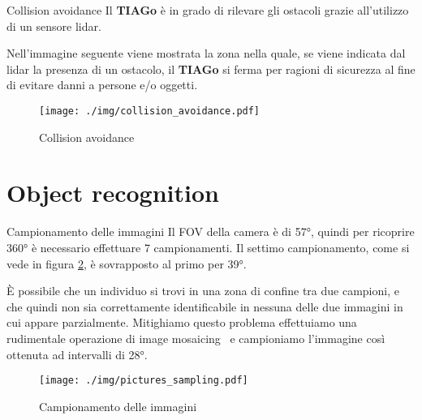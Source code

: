 \documentclass[10pt]{beamer}
\begin{document}
	\begin{frame}{Collision avoidance}
		Il \textbf{TIAGo} è in grado di rilevare gli ostacoli grazie
		all'utilizzo di un sensore lidar.  
		
		Nell'immagine seguente viene mostrata la zona nella quale, se viene
		indicata dal lidar la presenza di un ostacolo, il \textbf{TIAGo} si
		ferma per ragioni di sicurezza al fine di evitare danni a persone e/o
		oggetti.
		\begin{figure}[H]
			\centering
			\texttt{[image: ./img/collision\_avoidance.pdf]}
			\caption{Collision avoidance}
			\label{fig:collision_avoidance}
		\end{figure}
	\end{frame}
	
	\section{Object recognition}\label{sec:Object-recognition}
	\frame{\sectionpage}
	
	\begin{frame}{Campionamento delle immagini}
		Il FOV della camera è di 57°, quindi per ricoprire 360° è necessario
		effettuare 7 campionamenti. Il settimo campionamento, come si vede in
		figura \ref{fig:campionamento_immagini}, è sovrapposto al primo per 39°.

		È possibile che un individuo si trovi in una zona di confine
		tra due campioni, e che quindi non sia correttamente identificabile in
		nessuna delle due immagini in cui appare parzialmente. Mitighiamo
		questo problema effettuiamo una rudimentale operazione di image
		mosaicing~\cite{ghosh2016survey} e campioniamo l'immagine così
		ottenuta ad intervalli di 28°.
		
		
		\begin{figure}[H]
			\centering
			\texttt{[image: ./img/pictures\_sampling.pdf]}
			\caption{Campionamento delle immagini}
			\label{fig:campionamento_immagini}
		\end{figure}
	\end{frame}
	
\end{document}
